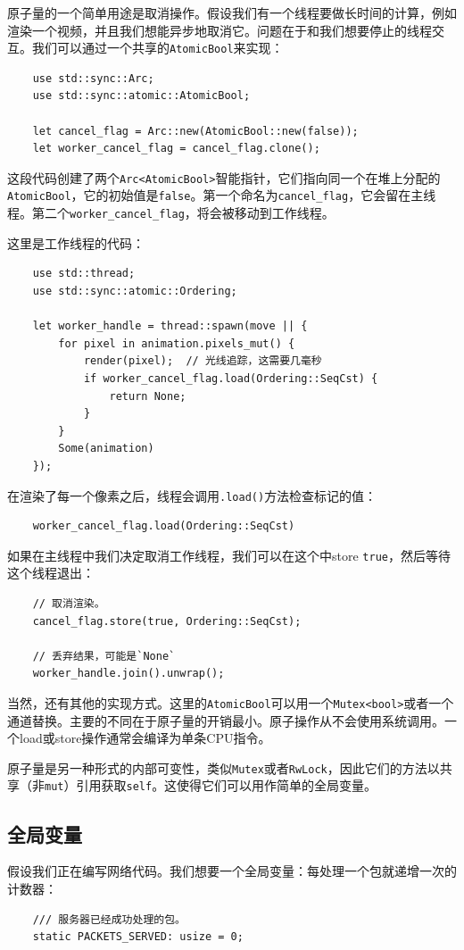 原子量的一个简单用途是取消操作。假设我们有一个线程要做长时间的计算，例如渲染一个视频，并且我们想能异步地取消它。问题在于和我们想要停止的线程交互。我们可以通过一个共享的\texttt{AtomicBool}来实现：
\begin{verbatim}
    use std::sync::Arc;
    use std::sync::atomic::AtomicBool;

    let cancel_flag = Arc::new(AtomicBool::new(false));
    let worker_cancel_flag = cancel_flag.clone();
\end{verbatim}

这段代码创建了两个\texttt{Arc<AtomicBool>}智能指针，它们指向同一个在堆上分配的\texttt{AtomicBool}，它的初始值是\texttt{false}。第一个命名为\texttt{cancel\_flag}，它会留在主线程。第二个\texttt{worker\_cancel\_flag}，将会被移动到工作线程。

这里是工作线程的代码：
\begin{verbatim}
    use std::thread;
    use std::sync::atomic::Ordering;

    let worker_handle = thread::spawn(move || {
        for pixel in animation.pixels_mut() {
            render(pixel);  // 光线追踪，这需要几毫秒
            if worker_cancel_flag.load(Ordering::SeqCst) {
                return None;
            }
        }
        Some(animation)
    });
\end{verbatim}

在渲染了每一个像素之后，线程会调用\texttt{.load()}方法检查标记的值：
\begin{verbatim}
    worker_cancel_flag.load(Ordering::SeqCst)
\end{verbatim}

如果在主线程中我们决定取消工作线程，我们可以在这个中store \texttt{true}，然后等待这个线程退出：
\begin{verbatim}
    // 取消渲染。
    cancel_flag.store(true, Ordering::SeqCst);

    // 丢弃结果，可能是`None`
    worker_handle.join().unwrap();
\end{verbatim}

当然，还有其他的实现方式。这里的\texttt{AtomicBool}可以用一个\texttt{Mutex<bool>}或者一个通道替换。主要的不同在于原子量的开销最小。原子操作从不会使用系统调用。一个load或store操作通常会编译为单条CPU指令。

原子量是另一种形式的内部可变性，类似\texttt{Mutex}或者\texttt{RwLock}，因此它们的方法以共享（非\texttt{mut}）引用获取\texttt{self}。这使得它们可以用作简单的全局变量。

\subsection{全局变量}\label{globalvar}
假设我们正在编写网络代码。我们想要一个全局变量：每处理一个包就递增一次的计数器：
\begin{verbatim}
    /// 服务器已经成功处理的包。
    static PACKETS_SERVED: usize = 0;
\end{verbatim}


